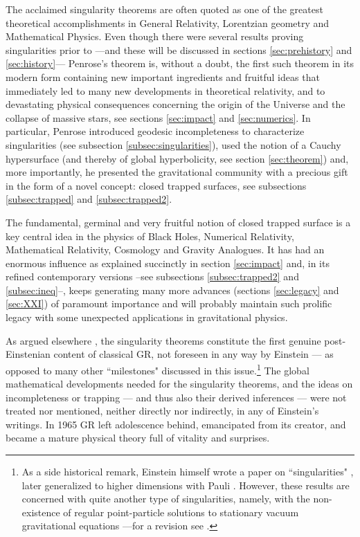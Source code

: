 \documentclass[12pt]{iopart}
\begin{document}
The acclaimed singularity theorems are often quoted as one of the greatest theoretical accomplishments in General Relativity, Lorentzian geometry and Mathematical Physics. Even though there were several results proving singularities prior to \cite{P} ---and these will be discussed in sections \ref{sec:prehistory} and \ref{sec:history}--- Penrose's theorem is, without a doubt, the first such theorem in its modern form containing new important ingredients and fruitful ideas that immediately led to many new developments in theoretical relativity, and to devastating physical consequences concerning the origin of the Universe and the collapse of massive stars, see sections \ref{sec:impact} and \ref{sec:numerics}. In particular, Penrose introduced geodesic incompleteness to characterize singularities (see subsection \ref{subsec:singularities}), used the notion of a Cauchy hypersurface (and thereby of global hyperbolicity, see section \ref{sec:theorem}) and, more importantly, he presented the gravitational community with a precious gift in the form of a novel concept: closed trapped surfaces, see subsections \ref{subsec:trapped} and \ref{subsec:trapped2}.

The fundamental, germinal and very fruitful notion of closed trapped surface is a key central idea in the physics of Black Holes, Numerical Relativity, Mathematical Relativity, Cosmology and Gravity Analogues. It has had an enormous influence as explained succinctly in section \ref{sec:impact} and, in its refined contemporary versions --see subsections \ref{subsec:trapped2} and \ref{subsec:ineq}--, keeps generating many more advances (sections \ref{sec:legacy} and \ref{sec:XXI}) of paramount importance and will probably maintain such prolific legacy with some unexpected applications in gravitational physics.

As argued elsewhere \cite{S5}, the singularity theorems constitute the first genuine post-Einstenian content of classical GR, not foreseen in any way by Einstein --- as opposed to many other ``milestones" discussed in this issue.\footnote{As a side historical remark, Einstein himself wrote a paper on ``singularities" \cite{E}, later generalized to higher dimensions with Pauli \cite{EP}. However, these results are concerned with quite another type of 
singularities, namely, with the non-existence of regular point-particle solutions to stationary vacuum gravitational equations ---for a revision see \cite{GG}.} 
The global mathematical developments needed for the singularity theorems, and the ideas on incompleteness or trapping --- and thus also their 
derived inferences --- were not treated nor mentioned, neither directly nor 
indirectly, in any of Einstein's writings. In 1965 GR left adolescence behind, emancipated from its creator, and became a mature physical theory full of vitality and surprises. 
	
\end{document}
